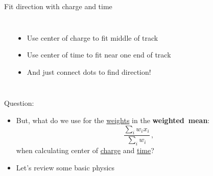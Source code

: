 \documentclass[14pt]{beamer}
\begin{document}
\begin{frame}{Fit direction with charge and time}
\begin{columns}[T]
\begin{block}{}
		\end{block}
		\begin{itemize}
			\item<2-> Use {\color{magenta}center of charge} to fit middle of
				track
			\item<3-> Use {\color{blue}center of time} to fit near one end of
				track
			\item<4-> And just connect dots to find direction!
		\end{itemize}
	\end{columns}
\end{frame}

\begin{frame}{Question:}
	\begin{itemize}
		\item<2-> {
				But, what do we use for the \underline{weights} in the
				\textbf{weighted~mean}:
				\begin{equation*}
					\frac{\sum_{i}w_{i}x_{i}}{\sum_{i}w_{i}}\,,
				\end{equation*}
				when calculating center of {\color{magenta}\underline{charge}} and
				{\color{blue}\underline{time}}?
			}
		\item<3-> Let's review some basic physics
	\end{itemize}
\end{frame}
\end{document}
